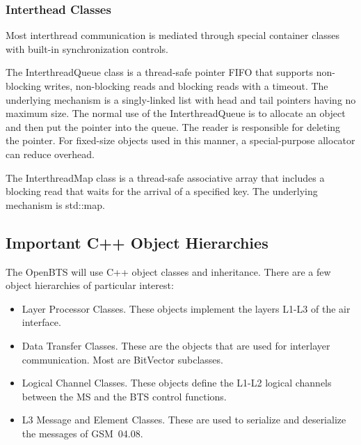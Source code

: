 \documentclass[11pt]{book}
\begin{document}
\subsubsection{Interthead Classes}
Most interthread communication is mediated through special container classes with built-in synchronization controls.

The InterthreadQueue class is a thread-safe pointer FIFO that supports non-blocking writes, non-blocking reads and blocking reads with a timeout.  The underlying mechanism is a singly-linked list with head and tail pointers having no maximum size.  The normal use of the InterthreadQueue is to allocate an object and then put the pointer into the queue.  The reader is responsible for deleting the pointer.  For fixed-size objects used in this manner, a special-purpose allocator can reduce overhead.

The InterthreadMap class is a thread-safe associative array that includes a blocking read that waits for the arrival of a specified key.  The underlying mechanism is std::map.


\subsection{Important C++ Object Hierarchies}
The OpenBTS will use C++ object classes and inheritance. There are a few object hierarchies of particular interest:
\begin{itemize}
	\item Layer Processor Classes.  These objects implement the layers L1-L3 of the air interface.
	\item Data Transfer Classes.  These are the objects that are used for interlayer communication.  Most are BitVector subclasses.
	\item Logical Channel Classes.  These objects define the L1-L2 logical channels between the MS and the BTS control functions.
	\item L3 Message and Element Classes.  These are used to serialize and deserialize the messages of GSM~04.08.
\end{itemize}
\end{document}
